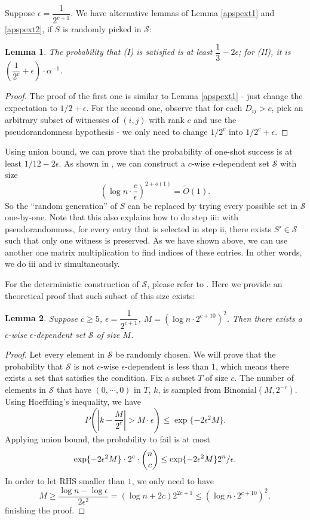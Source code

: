 \documentclass[12pt]{article}
\theoremstyle{plain}
\newtheorem{lemma}{Lemma}[section]
\begin{document}
Suppose $\epsilon=\dfrac{1}{2^{c+1}}$. We have alternative lemmas of Lemma \ref{apspext1} and \ref{apspext2}, if $S$ is randomly picked in $\mathcal{S}$:

\begin{lemma}
\label{apspext4}
The probability that (I) is satisfied is at least $\dfrac{1}{3}-2\epsilon$; for (II), it is $(\dfrac{1}{2^c}+\epsilon)\cdot \alpha^{-1}$.
\end{lemma}

\begin{proof}
The proof of the first one is similar to Lemma \ref{apspext1} - just change the expectation to $1/2+\epsilon$. For the second one, observe that for each $D_{ij}>c$, pick an arbitrary subset of witnesses of $(i,j)$ with rank $c$ and use the pseudorandomness hypothesis - we only need to change $1/2^c$ into $1/2^c+\epsilon$.
\end{proof}

Using union bound, we can prove that the probability of one-shot success is at least $1/12-2\epsilon$. As shown in \cite{10.1145/100216.100244}, we can construct a $c$-wise $\epsilon$-dependent set $\mathcal{S}$ with size
$$(\log n\cdot\dfrac{c}{\epsilon})^{2+o(1)}=\tilde O(1).$$
So the ``random generation'' of $S$ can be replaced by trying every possible set in $\mathcal{S}$ one-by-one. Note that this also explains how to do step iii: with pseudorandomness, for every entry that is selected in step ii, there exists $S'\in \mathcal{S}$ such that only one witness is preserved. As we have shown above, we can use another one matrix multiplication to find indices of these entries. In other words, we do iii and iv simultaneously.

For the deterministic construction of $\mathcal{S}$, please refer to \cite{10.1145/100216.100244}. Here we provide an theoretical proof that such subset of this size exists:

\begin{lemma}
\label{psr1}
Suppose $c\ge 5$, $\epsilon=\dfrac{1}{2^{c+1}}$, $M=(\log n\cdot 2^{c+10})^2$. Then there exists a $c$-wise $\epsilon$-dependent set $\mathcal{S}$ of size $M$.
\end{lemma}

\begin{proof}
Let every element in $\mathcal{S}$ be randomly chosen. We will prove that the probability that $\mathcal{S}$ is not $c$-wise $\epsilon$-dependent is less than $1$, which means there exists a set that satisfies the condition. Fix a subset $T$ of size $c$. The number of elements in $\mathcal{S}$ that have $(0,\cdots,0)$ in $T$, $k$, is sampled from $\text{Binomial}(M,2^{-c})$. Using Hoeffding's inequality, we have
$$P(|k-\dfrac{M}{2^{c}}|>M\cdot \epsilon) \le \exp\{-2\epsilon^2 M\}.$$
Applying union bound, the probability to fail is at most
$$\exp\{-2\epsilon^2 M\}\cdot 2^c\cdot \dbinom{n}{c}\le \exp\{-2\epsilon^2M\}2^n/\epsilon.$$
In order to let RHS smaller than $1$, we only need to have
$$M\ge \dfrac{\log n-\log \epsilon}{2\epsilon^2}=(\log n+2c)2^{2c+1}\le (\log n\cdot 2^{c+10})^2,$$
finishing the proof.
\end{proof}
\end{document}
